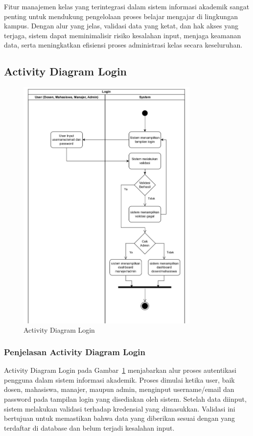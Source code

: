 \documentclass[a4paper,oneside,11pt]{book}
\begin{document}
Fitur manajemen kelas yang terintegrasi dalam sistem informasi akademik sangat penting untuk mendukung pengelolaan proses belajar mengajar di lingkungan kampus. Dengan alur yang jelas, validasi data yang ketat, dan hak akses yang terjaga, sistem dapat meminimalisir risiko kesalahan input, menjaga keamanan data, serta meningkatkan efisiensi proses administrasi kelas secara keseluruhan.


\subsection{Activity Diagram Login}
\begin{figure}[H]
  \centering
  \includegraphics[width=0.8\textwidth]{Activity Diagram/Login.jpg}
  \caption{Activity Diagram Login}
  \label{fig:activity_login}
\end{figure}

\subsubsection{Penjelasan Activity Diagram Login}
Activity Diagram Login pada Gambar~\ref{fig:activity_login} menjabarkan alur proses autentikasi pengguna dalam sistem informasi akademik. Proses dimulai ketika user, baik dosen, mahasiswa, manajer, maupun admin, menginput username/email dan password pada tampilan login yang disediakan oleh sistem. Setelah data diinput, sistem melakukan validasi terhadap kredensial yang dimasukkan. Validasi ini bertujuan untuk memastikan bahwa data yang diberikan sesuai dengan yang terdaftar di database dan belum terjadi kesalahan input.
\end{document}
